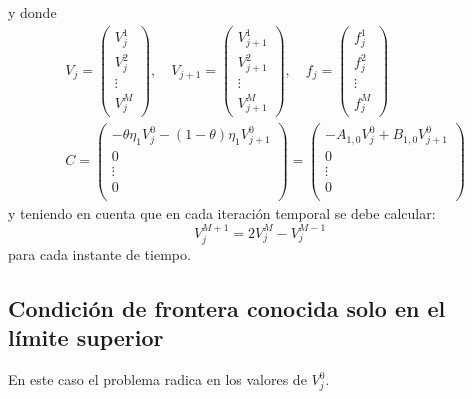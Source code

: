 y donde
\begin{align*}
    &\boxed{
        V_j = \begin{pmatrix}
            V_j^1 \\
            V_j^2 \\
            \vdots \\
            V_j^M
        \end{pmatrix}, \quad
        V_{j+1} = \begin{pmatrix}
            V_{j+1}^1 \\
            V_{j+1}^2 \\
            \vdots \\
            V_{j+1}^M
        \end{pmatrix}, \quad
        f_j = \begin{pmatrix}
            f_j^1 \\
            f_j^2 \\
            \vdots \\
            f_j^M
        \end{pmatrix}
    } \\
    &\boxed{
        C = \begin{pmatrix}
            -\theta\eta_1 V_j^{0} - (1-\theta)\eta_1 V_{j+1}^{0} \\
            0 \\
            \vdots \\
            0 \\
        \end{pmatrix}
        = \begin{pmatrix}
            -A_{1,0}V_j^{0} + B_{1,0}V_{j+1}^{0} \\
            0 \\
            \vdots \\
            0 \\
        \end{pmatrix}
    }
\end{align*}
y teniendo en cuenta que en cada iteración temporal se debe calcular:
\begin{equation*}
    \boxed{V_j^{M+1} = 2V_j^{M} - V_j^{M-1}}
\end{equation*}
para cada instante de tiempo.





\subsection{Condición de frontera conocida solo en el límite superior}\label{sec:DF_condicion_frontera_superior_conocida}
En este caso el problema radica en los valores de $V_j^0$.

